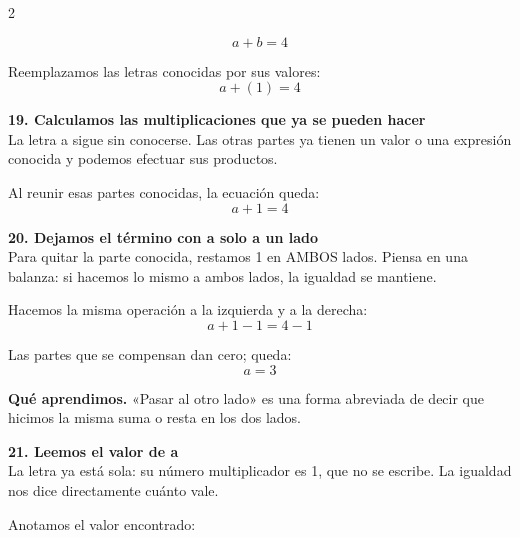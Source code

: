\documentclass[11pt,a4paper,landscape]{article}
\begin{document}
\begin{multicols*}{2}
\begin{minipage}{\linewidth}
\[a + b = 4\]
\par\smallskip Reemplazamos las letras conocidas por sus valores:
\[a + \left(1\right)=4\]
\end{minipage}\par\medskip
\noindent\begin{minipage}{\linewidth}\textbf{19. Calculamos las multiplicaciones que ya se pueden hacer}\\[2pt]La letra a sigue sin conocerse. Las otras partes ya tienen un valor o una expresión conocida y podemos efectuar sus productos.
\par{}\par\smallskip
\par\smallskip Al reunir esas partes conocidas, la ecuación queda:
\[a + 1=4\]
\end{minipage}\par\medskip
\noindent\begin{minipage}{\linewidth}\textbf{20. Dejamos el término con a solo a un lado}\\[2pt]Para quitar la parte conocida, restamos 1 en AMBOS lados. Piensa en una balanza: si hacemos lo mismo a ambos lados, la igualdad se mantiene.
\par\smallskip Hacemos la misma operación a la izquierda y a la derecha:
\[a + 1 - 1=4 - 1\]
\par\smallskip Las partes que se compensan dan cero; queda:
\[a=3\]
\par\smallskip\textbf{Qué aprendimos.} «Pasar al otro lado» es una forma abreviada de decir que hicimos la misma suma o resta en los dos lados.
\end{minipage}\par\medskip
\noindent\begin{minipage}{\linewidth}\textbf{21. Leemos el valor de a}\\[2pt]La letra ya está sola: su número multiplicador es 1, que no se escribe. La igualdad nos dice directamente cuánto vale.
\par\smallskip Anotamos el valor encontrado:

\end{minipage}
\end{multicols*}
\end{document}

